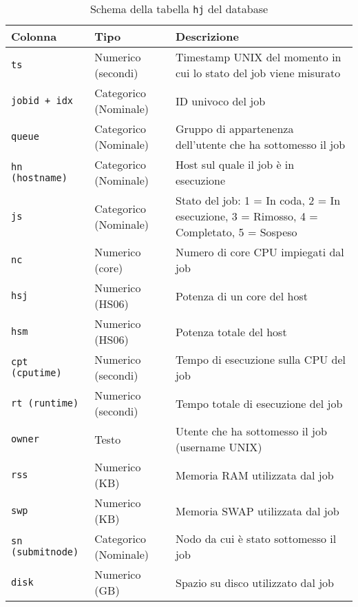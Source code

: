 \begin{table}[p]
    \centering
    \caption{Schema della tabella \texttt{hj} del database}
    \begin{tabular}{llp{6cm}}
        \toprule
        \textbf{Colonna} & \textbf{Tipo} & \textbf{Descrizione} \\
        \midrule
        \texttt{ts} & Numerico (secondi) & Timestamp UNIX del momento in
        cui lo stato del job viene misurato \\
        \texttt{jobid + idx} & Categorico (Nominale) & ID univoco del job \\
        \texttt{queue}  & Categorico (Nominale) & Gruppo di appartenenza
        dell'utente che ha sottomesso il job \\
        \texttt{hn (hostname)} & Categorico (Nominale) & Host sul quale il job è in esecuzione \\
        \texttt{js} & Categorico (Nominale) & Stato del job: 1 = In coda, 2 = In esecuzione, 3 = Rimosso, 4 = Completato, 5 = Sospeso \\
        \texttt{nc} & Numerico (core) & Numero di core CPU impiegati dal job \\
        \texttt{hsj} & Numerico (HS06) & Potenza di un core del host \\
        \texttt{hsm} & Numerico (HS06) & Potenza totale del host \\
        \texttt{cpt (cputime)} & Numerico (secondi) & Tempo di esecuzione sulla CPU del job\\
        \texttt{rt (runtime)} & Numerico (secondi) & Tempo totale di esecuzione del job\\
        \texttt{owner} & Testo & Utente che ha sottomesso il job (username UNIX) \\
        \texttt{rss} & Numerico (KB) & Memoria RAM utilizzata
        dal job\\
        \texttt{swp} & Numerico (KB) & Memoria SWAP utilizzata
        dal job\\
        \texttt{sn (submitnode)} & Categorico (Nominale) & Nodo da cui è stato sottomesso il job \\
        \texttt{disk} & Numerico (GB) & Spazio su disco
        utilizzato dal job \\
        \bottomrule
    \end{tabular}
    \label{table:schema_hj}
\end{table}

